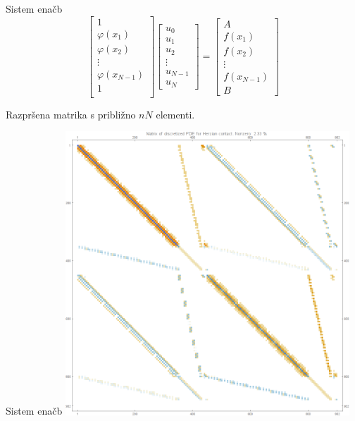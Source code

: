 \documentclass[t]{beamer} %
\begin{document}
\begin{frame}{Sistem enačb}
\[
\begin{bmatrix}
1  \\
\varphi(x_1) \\
\varphi(x_2) \\
\vdots \\
\varphi(x_{N-1}) \\
1   \\
\end{bmatrix}
\begin{bmatrix}
u_0 \\ u_1 \\ u_2 \\ \vdots \\ u_{N-1} \\ u_N
\end{bmatrix}
=
\begin{bmatrix}
A \\
f(x_1) \\
f(x_2) \\
\vdots \\
f(x_{N-1}) \\
B
\end{bmatrix}
\]

\vspace{4ex}

Razpršena matrika s približno $nN$ elementi.
\end{frame}

\begin{frame}{Sistem enačb}
  \vspace{-2ex}
  \centering
  \includegraphics[width=0.8\textwidth]{Matrix_hertzian.png}
\end{frame}
\end{document}
